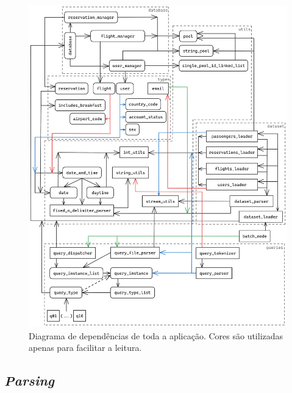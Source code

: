 \documentclass[12pt, a4paper]{article}
\begin{document}
\begin{figure}[ht]
    \centering
    \includegraphics[scale=0.10]{res/full_dependency_graph.png}
    \caption{Diagrama de dependências de toda a aplicação. Cores são utilizadas apenas para
             facilitar a leitura.}
    \label{fig:diagram}
\end{figure}

\subsection{\emph{Parsing}}
\label{sec:parsing}
\end{document}
